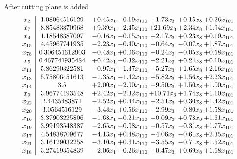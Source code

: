 \documentclass[8pt]{article}
\begin{document}
 After cutting plane is added 
\[\begin{array}{c| c c@{\hskip 2pt} c@{\hskip 2pt} c@{\hskip 2pt} c@{\hskip 2pt} c@{\hskip 2pt} }
 x_{2}   &  1.08064516129 & +  0.45 x_{1} & -0.19 x_{110} & +  1.73 x_{3} & +  0.15 x_{8} & +  0.26 x_{101}\\
 x_{7}   &  8.85483870968 & +  9.39 x_{1} & -2.45 x_{110} & + 21.69 x_{3} & +  2.34 x_{8} & +  1.94 x_{101}\\
 x_{4}   &  1.18548387097 & -0.16 x_{1} & -0.15 x_{110} & +  2.17 x_{3} & +  0.23 x_{8} & +  0.19 x_{101}\\
 x_{15}   &  4.45967741935 & -2.23 x_{1} & -0.40 x_{110} & +  0.64 x_{3} & -0.07 x_{8} & +  1.87 x_{101}\\
 x_{78}   &  0.306451612903 & -0.48 x_{1} & +  0.06 x_{110} & -0.24 x_{3} & -0.05 x_{8} & +  0.58 x_{101}\\
 x_{5}   &  0.467741935484 & +  0.42 x_{1} & -0.32 x_{110} & +  2.21 x_{3} & +  0.24 x_{8} & +  0.10 x_{101}\\
 x_{11}   &  5.86290322581 & -0.97 x_{1} & -1.37 x_{110} & +  5.27 x_{3} & +  1.65 x_{8} & +  2.16 x_{101}\\
 x_{13}   &  5.75806451613 & -1.35 x_{1} & -1.42 x_{110} & +  5.82 x_{3} & +  1.56 x_{8} & +  2.23 x_{101}\\
 x_{14}   &  3.5 & +  2.00 x_{1} & -2.00 x_{110} & +  9.50 x_{3} & +  1.50 x_{8} & +  1.00 x_{101}\\
 x_{9}   &  3.96774193548 & +  2.42 x_{1} & -2.32 x_{110} & + 10.71 x_{3} & +  1.74 x_{8} & +  1.10 x_{101}\\
 x_{22}   &  2.4435483871 & -2.52 x_{1} & +  0.44 x_{110} & -2.51 x_{3} & +  0.30 x_{8} & +  1.42 x_{101}\\
 x_{20}   &  3.0564516129 & -3.48 x_{1} & +  0.56 x_{110} & -2.99 x_{3} & -0.80 x_{8} & +  1.58 x_{101}\\
 x_{16}   &  3.37903225806 & -1.68 x_{1} & -0.21 x_{110} & -0.09 x_{3} & +  0.78 x_{8} & +  1.61 x_{101}\\
 x_{19}   &  3.99193548387 & -2.65 x_{1} & -0.08 x_{110} & -0.57 x_{3} & -0.31 x_{8} & +  1.77 x_{101}\\
 x_{17}   &  4.54838709677 & -4.13 x_{1} & +  0.48 x_{110} & -4.06 x_{3} & -0.61 x_{8} & +  2.35 x_{101}\\
 x_{21}   &  3.16129032258 & -3.10 x_{1} & +  0.61 x_{110} & -3.55 x_{3} & -0.71 x_{8} & +  1.52 x_{101}\\
 x_{18}   &  3.27419354839 & -2.06 x_{1} & -0.26 x_{110} & +  0.47 x_{3} & +  0.69 x_{8} & +  1.68 x_{101}\\

\end{array}\]
\end{document}
